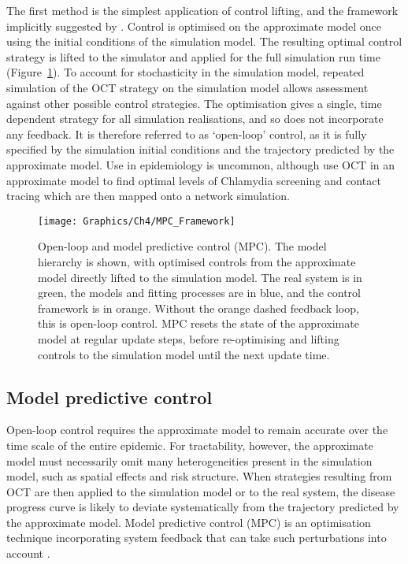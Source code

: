 The first method is the simplest application of control lifting, and the framework implicitly suggested by \citet{an_optimization_2017}. Control is optimised on the approximate model once using the initial conditions of the simulation model. The resulting optimal control strategy is lifted to the simulator and applied for the full simulation run time (Figure~\ref{fig:ch4:mpc_framework}). To account for stochasticity in the simulation model, repeated simulation of the OCT strategy on the simulation model allows assessment against other possible control strategies. The optimisation gives a single, time dependent strategy for all simulation realisations, and so does not incorporate any feedback. It is therefore referred to as `open-loop' control, as it is fully specified by the simulation initial conditions and the trajectory predicted by the approximate model. Use in epidemiology is uncommon, although \citet{clarke_approximating_2013} use OCT in an approximate model to find optimal levels of Chlamydia screening and contact tracing which are then mapped onto a network simulation.

\begin{figure}[htb]
    \begin{center}
        \texttt{[image: Graphics/Ch4/MPC\_Framework]}
        \caption{Open-loop and model predictive control (MPC). The model hierarchy is shown, with optimised controls from the approximate model directly lifted to the simulation model. The real system is in green, the models and fitting processes are in blue, and the control framework is in orange. Without the orange dashed feedback loop, this is open-loop control. MPC resets the state of the approximate model at regular update steps, before re-optimising and lifting controls to the simulation model until the next update time. }
        \label{fig:ch4:mpc_framework}
    \end{center}
\end{figure}

\subsection{Model predictive control}

Open-loop control requires the approximate model to remain accurate over the time scale of the entire epidemic. For tractability, however, the approximate model must necessarily omit many heterogeneities present in the simulation model, such as spatial effects and risk structure. When strategies resulting from OCT are then applied to the simulation model or to the real system, the disease progress curve is likely to deviate systematically from the trajectory predicted by the approximate model. Model predictive control (MPC) is an optimisation technique incorporating system feedback that can take such perturbations into account \citep{camacho_model_2012, lee_model_2011}.

